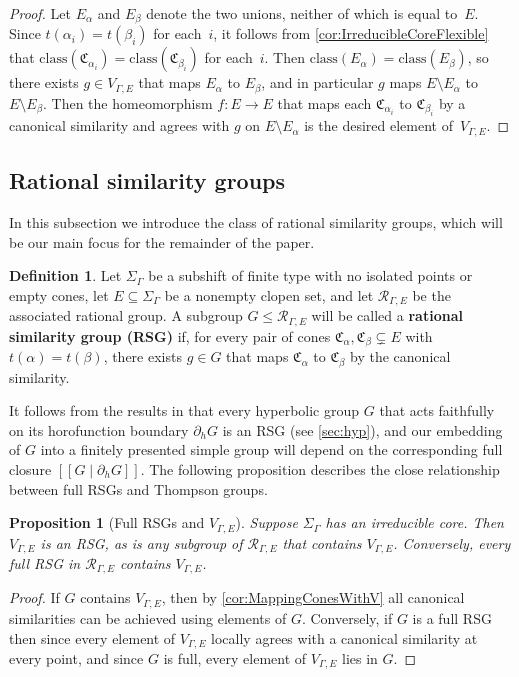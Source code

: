 \documentclass[11pt,letterpaper]{amsart}
\newtheorem{proposition}[theorem]{Proposition}
\theoremstyle{definition}
\newtheorem{definition}[theorem]{Definition}
\newcommand{\newword}[1]{\textbf{#1}}
\newcommand{\R}{\mathcal{R}}
\newcommand{\C}{\mathfrak{C}}
\newcommand{\class}{\mathrm{class}}
\begin{document}
\begin{proof}
Let $E_\alpha$ and $E_\beta$ denote the two unions, neither of which is equal to~$E$.  Since $t(\alpha_i)=t(\beta_i)$ for each~$i$, it follows from \cref{cor:IrreducibleCoreFlexible} that $\class(\C_{\alpha_i})=\class(\C_{\beta_i})$ for each~$i$. Then $\class(E_\alpha)=\class(E_\beta)$, so there exists $g\in V_{\Gamma,E}$ that maps $E_\alpha$ to $E_\beta$, and in particular $g$ maps $E\setminus E_\alpha$ to $E\setminus E_\beta$.  Then the homeomorphism $f\colon E\to E$ that maps each $\C_{\alpha_i}$ to $\C_{\beta_i}$ by a canonical similarity and agrees with $g$ on $E\setminus E_\alpha$ is the desired element of~$V_{\Gamma,E}$.
\end{proof}


\subsection{Rational similarity groups}\label{ssec:RSGs}

In this subsection we introduce the class of rational similarity groups, which will be our main focus for the remainder of the paper.

\begin{definition}\label{def:rsg}
Let $\Sigma_{\Gamma}$ be a subshift of finite type with no isolated points or empty cones, let $E\subseteq \Sigma_\Gamma$ be a nonempty clopen set, and let $\R_{\Gamma,E}$ be the associated rational group.  A subgroup $G\leq \R_{\Gamma,E}$ will be called a \newword{rational similarity group (RSG)} if, for every pair of cones $\C_\alpha,\C_\beta \subsetneq E$ with $t(\alpha)=t(\beta)$, there exists $g\in G$ that maps $\C_\alpha$ to $\C_\beta$ by the canonical similarity.
\end{definition}

It follows from the results in \cite{BelkBleakMatucci} that every hyperbolic group $G$ that acts faithfully on its horofunction boundary $\partial_h G$ is an RSG (see \cref{sec:hyp}), and our embedding of $G$ into a finitely presented simple group will depend on the corresponding full closure $[[G \mid \partial_h G]]$.  The following proposition describes the close relationship between full RSGs and Thompson groups.

\begin{proposition}[Full RSGs and $V_{\Gamma,E}$]\label{prop:RSGsAndV}
Suppose\/ $\Sigma_\Gamma$ has an irreducible core. Then $V_{\Gamma,E}$ is an RSG, as is any subgroup of $\R_{\Gamma,E}$ that contains $V_{\Gamma,E}$.  Conversely, every full RSG in $\R_{\Gamma,E}$ contains $V_{\Gamma,E}$.
\end{proposition}
\begin{proof}
If $G$ contains $V_{\Gamma,E}$, then by \cref{cor:MappingConesWithV} all canonical similarities can be achieved using elements of $G$. Conversely, if $G$ is a full RSG then since every element of $V_{\Gamma,E}$ locally agrees with a canonical similarity at every point, and since $G$ is full, every element of $V_{\Gamma,E}$ lies in $G$.
\end{proof}
\end{document}

